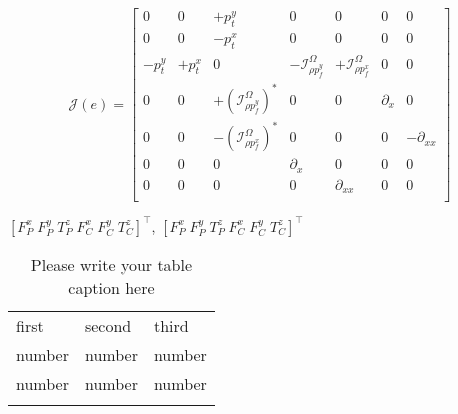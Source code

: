 \begin{equation}
\label{eq:EB_J}
\mathcal{J}(e) = 
\begin{bmatrix}
0 & 0 & +p_t^y      & 0 & 0 & 0 & 0 \\
0 & 0 & -p_t^x     & 0 & 0 & 0 & 0 \\
-p_t^y & +p_t^x & 0 & -\mathcal{I}_{\rho p_f^y}^{\Omega} & +\mathcal{I}_{\rho p_f^x}^{\Omega} & 0 & 0 \\
0 & 0 & +(\mathcal{I}_{\rho p_f^y}^{\Omega})^* & 0 & 0 & \partial_x & 0  \\
0 & 0 & -(\mathcal{I}_{\rho p_f^x}^{\Omega})^* & 0 & 0 & 0 & -\partial_{xx} \\
0 & 0 & 0 & \partial_{x} & 0 & 0 & 0 \\
0 & 0 & 0 & 0 & \partial_{xx} & 0 & 0 \\
\end{bmatrix}
\end{equation}


$[F_{P}^x \; F_{P}^y \; T_{P}^z \; F_{C}^x \; F_{C}^y \; T_{C}^z]^\top$, $[F_{P}^x \; F_{P}^y \; T_{P}^z \; F_{C}^x \; F_{C}^y \; T_{C}^z]^\top$
\begin{table}
\caption{Please write your table caption here}
\label{tab:1}       %
\begin{tabular}{lll}
\hline\noalign{\smallskip}
first & second & third  \\
\noalign{\smallskip}\hline\noalign{\smallskip}
number & number & number \\
number & number & number \\
\noalign{\smallskip}\hline
\end{tabular}
\end{table}




 




